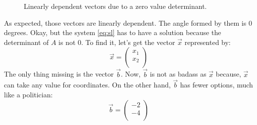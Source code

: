 \documentclass[600paper, 11pt,twoside,openany]{kdp}
\begin{document}
\begin{figure}[h!]
\begin{center}
\end{center}
\caption{Linearly dependent vectors due to a zero value determinant.}
\end{figure}
\par 
\vspace{-3pt}
\indent As expected, those vectors are linearly dependent. The angle formed by them is 0 degrees. Okay, but the system \ref{eq:sl} has to have a solution because the determinant of $A$ is not 0. To find it, let’s get the vector $\overrightarrow{x}$ represented by:
\[\overrightarrow{x} =  \begin{pmatrix}
x_1 \\
x_2  \\
\end{pmatrix} \]
\indent The only thing missing is the vector $\overrightarrow{b}$. Now, $\overrightarrow{b}$ is not as badass as $\overrightarrow{x}$ because, $\overrightarrow{x}$ can take any value for coordinates. On the other hand, $\overrightarrow{b}$ has fewer options, much like a politician:
\[\overrightarrow{b} =  \begin{pmatrix}
-2 \\
-4 \\
\end{pmatrix}\] 
\end{document}
